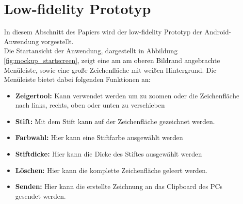 \documentclass{chi-ext}
\begin{document}
\section{Low-fidelity Prototyp}
In diesem Abschnitt des Papiers wird der low-fidelity Prototyp der Android-Anwendung vorgestellt.\\

Die Startansicht der Anwendung, dargestellt in Abbildung \ref{fig:mockup_startscreen}, zeigt eine am am oberen Bildrand angebrachte Menüleiste, sowie eine große Zeichenfläche mit weißen Hintergrund. 
Die Menüleiste bietet dabei folgenden Funktionen an:

\begin{itemize}
	\item {\textbf{Zeigertool:} Kann verwendet werden um zu zoomen oder die Zeichenfläche nach links, rechts, oben oder unten zu verschieben}
	\item {\textbf{Stift:} Mit dem Stift kann auf der Zeichenfläche gezeichnet werden.}
	\item {\textbf{Farbwahl:} Hier kann eine Stiftfarbe ausgewählt werden}
	\item {\textbf{Stiftdicke:} Hier kann die Dicke des Stiftes ausgewählt werden}
	\item {\textbf{Löschen:} Hier kann die komplette Zeichenfläche geleert werden.}
	\item {\textbf{Senden:} Hier kann die erstellte Zeichnung an das Clipboard des PCs gesendet werden.}
\end{itemize}
\end{document}
